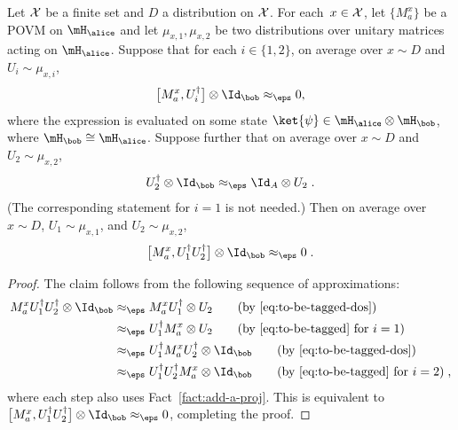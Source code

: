 \begin{lemma}
  \label{lem:commute-with-both}
  Let $\cal{X}$ be a finite set and $D$ a distribution on $\cal{X}$.
  For each~$x\in \cal{X}$, let $\{ M^x_a \}$ be a POVM on $\mH_\alice$ and let
  $\mu_{x,1}, \mu_{x,2}$ be two distributions over unitary matrices acting on
  $\mH_\alice$.
  Suppose that for each $i \in \{1, 2\}$, on average over $x \sim D$ and $U_i
  \sim \mu_{x,i}$,
  \begin{equation}\label{eq:to-be-tagged}
    \bigl[ M^x_a , U_i^\dagger \bigr] \otimes \Id_\bob \approx_{\eps} 0,
  \end{equation}
  where the expression is evaluated on some state $\ket{\psi} \in
  \mH_\alice\otimes\mH_\bob$, where $\mH_\bob \cong \mH_\alice$.
  Suppose further that on average over $x \sim D$ and $U_2 \sim \mu_{x, 2}$,
  \begin{equation}\label{eq:to-be-tagged-dos}
    U_2^\dagger \otimes \Id_\bob \approx_{\eps} \Id_A \otimes U_2\;.
  \end{equation}
  (The corresponding statement for $i = 1$ is not needed.)
  Then on average over $x \sim D$, $U_1 \sim \mu_{x, 1}$, and $U_2 \sim \mu_{x,
    2}$,
  \begin{equation*}
    \bigl[ M^x_a , U_1^\dagger U_2^\dagger \bigr] \otimes \Id_\bob
    \approx_{\eps} 0\;.
  \end{equation*} 
\end{lemma}

\begin{proof}
  The claim follows from the following sequence of approximations:
  \begin{align*}
    M^x_a U_1^\dagger U_2^\dagger \otimes \Id_\bob
    & \approx_{\eps} M^x_a U_1^\dagger \otimes U_2
      \tag{by~\eqref{eq:to-be-tagged-dos}}\\
    & \approx_{\eps} U_1^\dagger M^x_a  \otimes U_2
      \tag{by~\eqref{eq:to-be-tagged} for $i = 1$}\\
    & \approx_{\eps} U_1^\dagger M^x_a U_2^\dagger \otimes \Id_\bob
      \tag{by~\eqref{eq:to-be-tagged-dos}}\\
    & \approx_{\eps} U_1^\dagger U_2^\dagger M^x_a \otimes \Id_\bob
      \tag{by~\eqref{eq:to-be-tagged} for $i = 2$}\;,
  \end{align*}
  where each step also uses Fact~\ref{fact:add-a-proj}.
  This is equivalent to $\bigl[ M^x_a , U_1^\dagger U_2^\dagger \bigr] \otimes
  \Id_\bob \approx_{\eps} 0$, completing the proof.
\end{proof}

